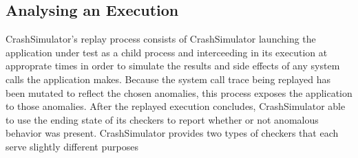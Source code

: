     \subsection{Analysing an Execution}

    CrashSimulator's replay process consists of CrashSimulator launching the
    application under test as a child process and interceeding in its execution
    at approprate times in order to simulate the results and side effects of any
    system calls the application makes.  Because the system call trace being
    replayed has been mutated to reflect the chosen anomalies, this process
    exposes the application to those anomalies. After the replayed execution
    concludes, CrashSimulator able to use the ending state of its checkers to
    report whether or not anomalous behavior was present. CrashSimulator
    provides two types of checkers that each serve slightly different purposes




